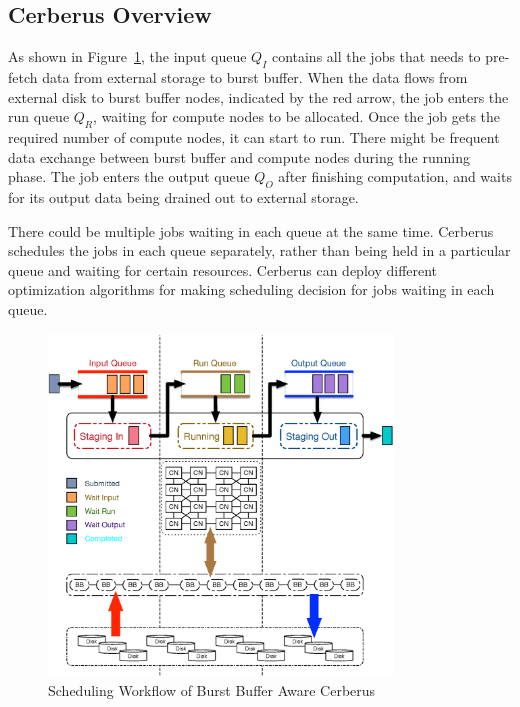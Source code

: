 \subsection{Cerberus Overview}
As shown in Figure~\ref{Fig:CerberusQueues},
the input queue $Q_I$ contains all the jobs that
needs to pre-fetch data from external storage to burst buffer.
When the data flows from external disk
to burst buffer nodes, indicated by the red arrow, the job enters the run queue $Q_R$, 
waiting for compute nodes to be allocated.
Once the job gets the required number of compute nodes, it can start to run.
There might be frequent data exchange between burst buffer and compute nodes during the running phase. 
The job enters the output queue $Q_O$ after finishing computation, 
and waits for its output data being drained out to external storage. 

There could be multiple jobs waiting in each queue at the same time. 
Cerberus schedules the jobs in each queue separately, 
rather than being held in a particular queue and waiting for certain resources.
Cerberus can deploy different optimization algorithms for making scheduling decision
for jobs waiting in each queue.



\begin{figure}[!t]
        \centering
        \includegraphics[width=3.6in]{CerberusBBSystem}
        \caption{Scheduling Workflow of Burst Buffer Aware Cerberus}
        \label{Fig:CerberusQueues}
\end{figure}


